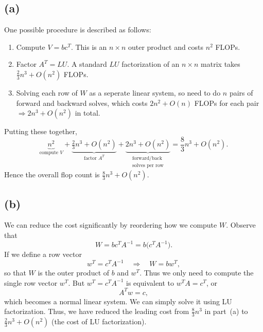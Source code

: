 \documentclass{article}
\begin{document}
\subsection*{(a)}
One possible procedure is described as follows:

\begin{enumerate}
    \item Compute $V = bc^T$.  This is an $n\times n$ outer product and costs $n^2$ FLOPs.
    \item Factor $A^T = LU$. A standard $LU$ factorization of an $n \times n$ matrix takes $\tfrac{2}{3}n^3 + O(n^2)$ FLOPs.
    \item Solving each row of $W$ as a seperate linear system, so need to do $n$ pairs of forward and backward solves, which costs $2n^2+O(n)$ FLOPs for each pair $\Longrightarrow 2n^3+O(n^2)$ in total.
\end{enumerate}
Putting these together,
$$
    \boxed{
    \underbrace{n^2}_{\text{compute }V}
    +
    \underbrace{\tfrac{2}{3}n^3+O(n^2)}_{\text{factor }A^T}
    +
    \underbrace{2n^3+O(n^2)}_{\substack{\text{forward/back}\\\text{solves per row}}}
    =
    \frac{8}{3}n^3
    +O(n^2)
    }.
$$
Hence the overall flop count is $\frac{8}{3}n^3 + O(n^2)$.

\subsection*{(b)}
We can reduce the cost significantly by reordering how we compute $W$.
Observe that
$$
    W
    =
    bc^TA^{-1}
    =
    b
    \bigl(c^TA^{-1}\bigr).
$$
If we define a row vector
$$
    w^T = c^TA^{-1}
    \quad\Longrightarrow\quad
    W = bw^T,
$$
so that $W$ is the outer product of $b$ and $w^T$.
Thus we only need to compute the single row vector $w^T$.
But $w^T = c^TA^{-1}$ is equivalent to $w^T A = c^T$, or
$$
    A^T w = c,
$$
which becomes a normal linear system. We can simply solve it using LU factorization. Thus, we have reduced the leading cost from $\tfrac{8}{3}n^3$ in part~(a) to $\tfrac{2}{3}n^3+O(n^2)$ (the cost of LU factorization).

\newpage
\end{document}
